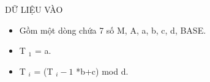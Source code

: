 DỮ LIỆU VÀO
\begin{itemize}
	\item     Gồm một dòng chứa 7 số M, A, a, b, c, d, BASE.   
	\item     T    $_     1    $    = a.   
	\item     T    $_     i    $    = (T    $_     i-1    $    *b+c) mod d.   
\end{itemize}